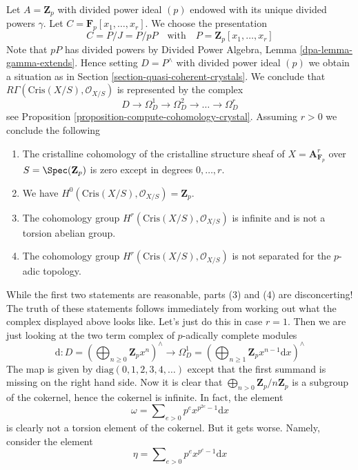 \begin{example}
\label{example-affine-n-space}
Let $A = \mathbf{Z}_p$ with divided power ideal $(p)$ endowed with
its unique divided powers $\gamma$. Let
$C = \mathbf{F}_p[x_1, \ldots, x_r]$. We choose the presentation
$$
C = P/J = P/pP\quad\text{with}\quad P = \mathbf{Z}_p[x_1, \ldots, x_r]
$$
Note that $pP$ has divided powers by
Divided Power Algebra, Lemma \ref{dpa-lemma-gamma-extends}.
Hence setting $D = P^\wedge$ with divided power ideal $(p)$ we obtain a
situation as in Section \ref{section-quasi-coherent-crystals}.
We conclude that $R\Gamma(\text{Cris}(X/S), \mathcal{O}_{X/S})$
is represented by the complex
$$
D \to \Omega^1_D \to \Omega^2_D \to \ldots \to \Omega^r_D
$$
see Proposition \ref{proposition-compute-cohomology-crystal}.
Assuming $r > 0$ we conclude the following
\begin{enumerate}
\item The cristalline cohomology of the cristalline structure sheaf
of $X = \mathbf{A}^r_{\mathbf{F}_p}$ over $S = \Spec(\mathbf{Z}_p)$
is zero except in degrees $0, \ldots, r$.
\item We have $H^0(\text{Cris}(X/S), \mathcal{O}_{X/S}) = \mathbf{Z}_p$.
\item The cohomology group $H^r(\text{Cris}(X/S), \mathcal{O}_{X/S})$
is infinite and is not a torsion abelian group.
\item The cohomology group $H^r(\text{Cris}(X/S), \mathcal{O}_{X/S})$
is not separated for the $p$-adic topology.
\end{enumerate}
While the first two statements are reasonable, parts (3) and (4) are
disconcerting! The truth of these statements follows immediately from
working out what the complex displayed above looks like. Let's just do
this in case $r = 1$. Then we are just looking at the two term complex
of $p$-adically complete modules
$$
\text{d} :
D = \left(
\bigoplus\nolimits_{n \geq 0} \mathbf{Z}_p x^n
\right)^\wedge
\longrightarrow
\Omega^1_D = \left(
\bigoplus\nolimits_{n \geq 1} \mathbf{Z}_p x^{n - 1}\text{d}x
\right)^\wedge
$$
The map is given by $\text{diag}(0, 1, 2, 3, 4, \ldots)$ except that
the first summand is missing on the right hand side. Now it is clear
that $\bigoplus_{n > 0} \mathbf{Z}_p/n\mathbf{Z}_p$ is a subgroup
of the cokernel, hence the cokernel is infinite. In fact, the element
$$
\omega = \sum\nolimits_{e > 0} p^e x^{p^{2e} - 1}\text{d}x
$$
is clearly not a torsion element of the cokernel. But it gets worse.
Namely, consider the element
$$
\eta = \sum\nolimits_{e > 0} p^e x^{p^e - 1}\text{d}x
$$

\end{example}
